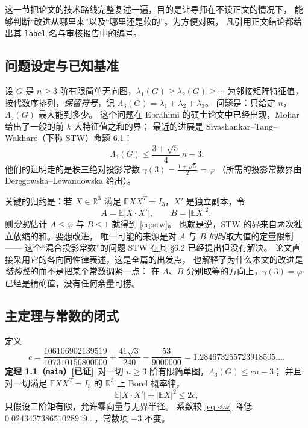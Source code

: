 \documentclass[UTF8,11pt]{ctexart}
\newcommand{\Lam}{\Lambda}
\newcommand{\R}{\mathbb{R}}
\newcommand{\E}{\mathbb{E}}
\newcommand{\file}[1]{\texttt{#1}}
\newcommand{\ok}{\textcolor[rgb]{0.05,0.45,0.15}{\bfseries [已证]}}
\begin{document}
这一节把论文的技术路线完整复述一遍，目的是让导师在不读正文的情况下，
能够判断``改进从哪里来''以及``哪里还是软的''。为方便对照，
凡引用正文结论都给出其 \file{label} 名与审核报告中的编号。

\subsection{问题设定与已知基准}

设 $G$ 是 $n\ge3$ 阶有限简单无向图，$\lambda_1(G)\ge\lambda_2(G)\ge\cdots$ 为邻接矩阵特征值，
按代数序排列，\emph{保留符号}，记 $\Lam_3(G)=\lambda_1+\lambda_2+\lambda_3$。
问题是：只给定 $n$，$\Lam_3(G)$ 最大能到多少。
这个问题在 Ebrahimi 的硕士论文中已经出现，Mohar 给出了一般的前 $k$ 大特征值之和的界；
最近的进展是 Sivashankar--Tang--Wakhare（下称 STW）命题 6.1：
\begin{equation}\label{eq:stw}
 \Lam_3(G)\le\frac{3+\sqrt5}{4}\,n-3 .
\end{equation}
他们的证明走的是秩三绝对投影常数 $\gamma(3)=\frac{1+\sqrt5}{2}=\varphi$
（所需的投影常数界由 Der\k{e}gowska--Lewandowska 给出）。

关键的归约是：若 $X\in\R^3$ 满足 $\E XX^T=I_3$，$X'$ 是独立副本，令
\[
 A=\E|X\cdot X'|,\qquad B=|\E X|^2 ,
\]
则\emph{分别}估计 $A\le\varphi$ 与 $B\le1$ 就得到 \eqref{eq:stw}。
也就是说，STW 的界来自两次独立放缩的和。要想改进，
唯一可能的来源是对 $A$ 与 $B$ \emph{同时}取大值的定量限制——
这个``混合投影常数''的问题 STW 在其 \S6.2 已经提出但没有解决。
论文直接采用它的各向同性律表述，这是全篇的出发点，
也解释了为什么本文的改进是\emph{结构性}的而不是把某个常数调紧一点：
在 $A$、$B$ 分别取等的方向上，$\gamma(3)=\varphi$ 已经是精确值，没有任何余量可捞。

\subsection{主定理与常数的闭式}

定义
\begin{equation}\label{eq:c}
 c=\frac{106106902139519}{107310156800000}+\frac{41\sqrt3}{240}-\frac{53}{9000000}
   =1.284673255723918505\ldots .
\end{equation}
\textbf{定理 1.1（\file{main}）}\ok\ 对一切 $n\ge3$ 阶有限简单图，$\Lam_3(G)\le cn-3$；
并且对一切满足 $\E XX^T=I_3$ 的 $\R^3$ 上 Borel 概率律，
\begin{equation}\label{eq:lawbound}
 \E|X\cdot X'|+|\E X|^2\le 2c ,
\end{equation}
只假设二阶矩有限，允许零向量与无界半径。
系数较 \eqref{eq:stw} 降低 $0.024343738651028919\ldots$，常数项 $-3$ 不变。
\end{document}
